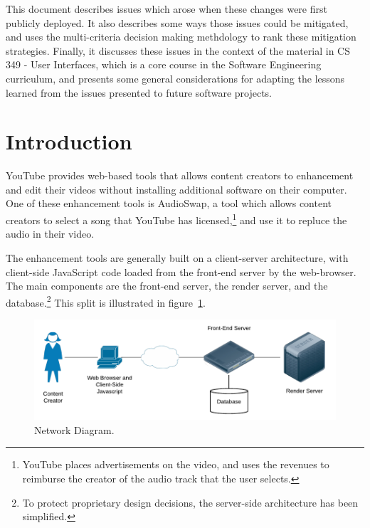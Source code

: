 \documentclass[se,resubmit]{uw-wkrpt}
\begin{document}
This document describes issues which arose when these changes were first
publicly deployed. It also describes some ways those issues could be
mitigated, and uses the multi-criteria decision making methdology to rank
these mitigation strategies. Finally, it discusses these issues in the
context of the material in CS 349 - User Interfaces, which is a core
course in the Software Engineering curriculum, and presents some general
considerations for adapting the lessons learned from the issues presented
to future software projects.

\tableofcontents
\listoffigures
\listoftables

\mainmatter

\section{Introduction}\label{sec:intro}
YouTube provides web-based tools that allows content creators to
enhancement and edit their videos without installing additional software on
their computer. One of these enhancement tools is AudioSwap, a tool which
allows content creators to select a song that YouTube has
licensed,\footnote{YouTube places advertisements on the video, and uses the
revenues to reimburse the creator of the audio track that the user
selects.} and use it to repluce the audio in their video.

The enhancement tools are generally built on a client-server architecture,
with client-side JavaScript code loaded from the front-end server by the
web-browser. The main components are the front-end server, the render
server, and the database.\footnote{To protect proprietary design decisions,
the server-side architecture has been simplified.}
This split is illustrated in figure~\ref{fig:network-diagram}.

\begin{figure}
  \centering
  \includegraphics{network-diagram}
  \caption{Network Diagram.}
  \label{fig:network-diagram}
\end{figure}
\end{document}
